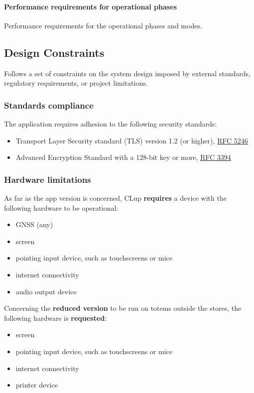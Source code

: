 \paragraph{Performance requirements for operational phases}
\label{par:operationalPhases}

Performance requirements for the operational phases and modes.

\subsection{Design Constraints}
Follows a set of constraints on the system design imposed by external standards, regulatory requirements, or project
limitations.

\subsubsection{Standards compliance}
\label{standards}
The application requires adhesion to the following security standards:\newline 
\begin{itemize}
    \item Transport Layer Security standard (TLS) version 1.2 (or higher), \href{https://tools.ietf.org/html/rfc5246}{RFC 5246}
    \item Advanced Encryption Standard with a 128-bit key or more, \href{http://www.networksorcery.com/enp/rfc/rfc3394.txt}{RFC 3394}
\end{itemize}

\subsubsection{Hardware limitations}
As far as the app version is concerned, CLup \textbf{requires} a device with the following hardware to be operational:\newline
\begin{itemize}
    \item GNSS (any)
    \item screen
    \item pointing input device, such as touchscreens or mice
    \item internet connectivity
    \item audio output device
\end{itemize}

\bigskip \noindent Concerning the \textbf{reduced version} to be run on totems outside the stores, the following hardware is \textbf{requested}:\newline
\begin{itemize}
    \item screen
    \item pointing input device, such as touchscreens or mice
    \item internet connectivity
    \item printer device
\end{itemize}

